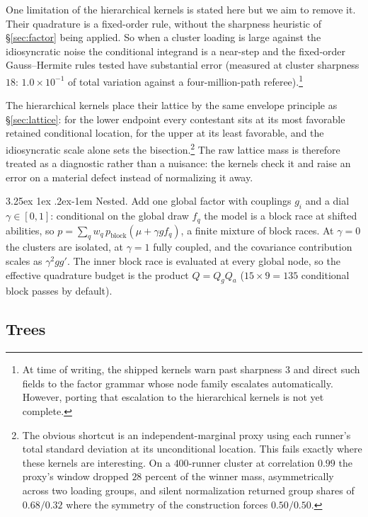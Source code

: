 \documentclass[11pt]{article}
\makeatletter
\renewcommand\paragraph{\@startsection{paragraph}{4}{\z@}%
  {3.25ex \@plus1ex \@minus.2ex}{-1em}%
  {\normalfont\normalsize\itshape}}
\makeatother
\begin{document}
One limitation of the hierarchical kernels is stated here but we aim to remove it.
Their quadrature is a fixed-order rule, without
the sharpness heuristic of \S\ref{sec:factor} being applied. So when a cluster loading
is large against the idiosyncratic noise the conditional integrand is a
near-step and the fixed-order Gauss--Hermite rules tested have
substantial error (measured at cluster
sharpness $18$: $1.0\times10^{-1}$ of total variation against a
four-million-path referee).\footnote{At time of writing, the shipped kernels warn past sharpness $3$ and
direct such fields to the factor grammar whose node family escalates
automatically. However, porting that escalation to the hierarchical kernels is not yet complete.}

The hierarchical kernels place their lattice by the same envelope
principle as \S\ref{sec:lattice}: for the lower endpoint every
contestant sits at its most favorable retained conditional location,
for the upper at its least favorable, and the idiosyncratic scale
alone sets the bisection.\footnote{The obvious shortcut is an
independent-marginal proxy using each runner's total standard deviation
at its unconditional location. This fails exactly where these kernels are
interesting. On a $400$-runner cluster at correlation $0.99$ the
proxy's window dropped $28$ percent of the winner mass, asymmetrically
across two loading groups, and silent normalization returned group
shares of $0.68/0.32$ where the symmetry of the construction forces
$0.50/0.50$.} The raw lattice mass is therefore treated as a diagnostic
rather than a nuisance: the kernels check it and raise an error on a
material defect instead of normalizing it away.

\paragraph{Nested.} Add one global factor with couplings $g_i$ and a dial
$\gamma\in[0,1]$: conditional on the global draw $f_q$ the model is a block race
at shifted abilities, so
$p=\sum_q w_q\,p_{\mathrm{block}}(\mu+\gamma g f_q)$, a finite mixture of block
races. At $\gamma=0$ the clusters are isolated, at $\gamma=1$ fully
coupled, and the covariance contribution scales as $\gamma^{2}gg'$. The
inner block race is evaluated at every global node, so the effective
quadrature budget is the product $Q=Q_gQ_a$ ($15\times9=135$ conditional
block passes by default).

\subsection{Trees}\label{sec:tree}
\end{document}
